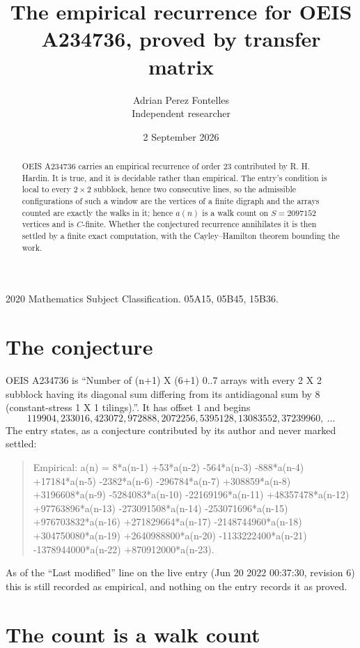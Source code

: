 \documentclass[11pt,a4paper]{article}
\title{The empirical recurrence for OEIS A234736, proved by transfer matrix}
\author{Adrian Perez Fontelles\\ \small Independent researcher}
\date{2 September 2026}
\theoremstyle{plain}
\theoremstyle{definition}
\begin{document}
\maketitle

\begin{abstract}
OEIS A234736 carries an empirical recurrence of order $23$ contributed by R. H. Hardin. It is
true, and it is decidable rather than empirical. The entry's condition is local to every $2\times2$ subblock, hence two consecutive lines, so
the admissible configurations of such a window are the vertices of a finite digraph and the
arrays counted are exactly the walks in it; hence $a(n)$ is a walk count on $S=2097152$ vertices
and is $C$-finite. Whether the conjectured recurrence annihilates it is then settled by a
finite exact computation, with the Cayley--Hamilton theorem bounding the work.
\end{abstract}

\noindent\small 2020 Mathematics Subject Classification. 05A15, 05B45, 15B36.\normalsize

\section{The conjecture}

OEIS A234736 is ``Number of (n+1) X (6+1) 0..7 arrays with every 2 X 2 subblock having its diagonal sum differing from its antidiagonal sum by 8 (constant-stress 1 X 1 tilings).''. It has offset $1$ and begins
\[
119904, 233016, 423072, 972888, 2072256, 5395128, 13083552, 37239960,\ \dots
\]
The entry states, as a conjecture contributed by its author and never marked settled:
\begin{quote}
Empirical: a(n) = 8*a(n-1) +53*a(n-2) -564*a(n-3) -888*a(n-4) +17184*a(n-5) -2382*a(n-6) -296784*a(n-7) +308859*a(n-8) +3196608*a(n-9) -5284083*a(n-10) -22169196*a(n-11) +48357478*a(n-12) +97763896*a(n-13) -273091508*a(n-14) -253071696*a(n-15) +976703832*a(n-16) +271829664*a(n-17) -2148744960*a(n-18) +304750080*a(n-19) +2640988800*a(n-20) -1133222400*a(n-21) -1378944000*a(n-22) +870912000*a(n-23).
\end{quote}
As of the ``Last modified'' line on the live entry (Jun 20 2022 00:37:30, revision 6) this is still
recorded as empirical, and nothing on the entry records it as proved.

\section{The count is a walk count}
\end{document}

